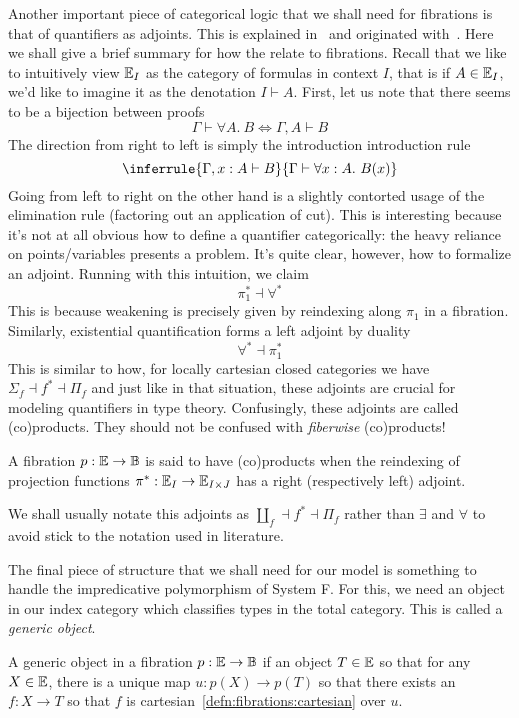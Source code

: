Another important piece of categorical logic that we shall need for
fibrations is that of quantifiers as adjoints. This is explained
in~\citet{Awodey:06} and originated with~\citet{Lawvere:69}. Here we
shall give a brief summary for how the relate to fibrations. Recall
that we like to intuitively view $\mathbb{E}_I$ as the category of formulas
in context $I$, that is if $A \in \mathbb{E}_I$, we'd like to imagine it as
the denotation $I \vdash A$. First, let us note that there seems to be
a bijection between proofs
\[
  \Gamma \vdash \forall A.\ B \iff \Gamma, A \vdash B
\]
The direction from right to left is simply the introduction
introduction rule
\[
  \inferrule{
    \Gamma, x : A \vdash B
  }{\Gamma \vdash \forall x : A.\ B(x)}
\]
Going from left to right on the other hand is a slightly contorted
usage of the elimination rule (factoring out an application of
cut). This is interesting because it's not at all obvious how to
define a quantifier categorically: the heavy reliance on
points/variables presents a problem. It's quite clear, however, how to
formalize an adjoint. Running with this intuition, we claim
\[
  \pi_1^* \dashv \forall^*
\]
This is because weakening is precisely given by reindexing along
$\pi_1$ in a fibration. Similarly, existential quantification forms a
left adjoint by duality
\[
   \forall^* \dashv \pi_1^*
\]
This is similar to how, for locally cartesian closed categories we
have $\Sigma_f \dashv f^* \dashv \Pi_f$ and just like in that
situation, these adjoints are crucial for modeling quantifiers in
type theory. Confusingly, these adjoints are called (co)products. They
should not be confused with \emph{fiberwise} (co)products!
\begin{defn}\label{defn:fibrations:products}
  A fibration $p : \mathbb{E} \to \mathbb{B}$ is said to have (co)products when
  the reindexing of projection functions
  $\pi^* : \mathbb{E}_I \to \mathbb{E}_{I \times J}$ has a right (respectively
  left) adjoint.
\end{defn}
We shall usually notate this adjoints as
$\amalg_f \dashv f^* \dashv \Pi_f$ rather than $\exists$ and $\forall$
to avoid stick to the notation used in literature.

The final piece of structure that we shall need for our model is
something to handle the impredicative polymorphism of System F. For
this, we need an object in our index category which classifies types
in the total category. This is called a \emph{generic object}.

\begin{defn}\label{defn:fibrations:genericobject}
  A generic object in a fibration $p : \mathbb{E} \to \mathbb{B}$ if an object
  $T \in \mathbb{E}$ so that for any $X \in \mathbb{E}$, there is a unique map
  $u : p(X) \to p(T)$ so that there exists an $f : X \to T$ so that
  $f$ is cartesian~\ref{defn:fibrations:cartesian} over $u$.
\end{defn}

